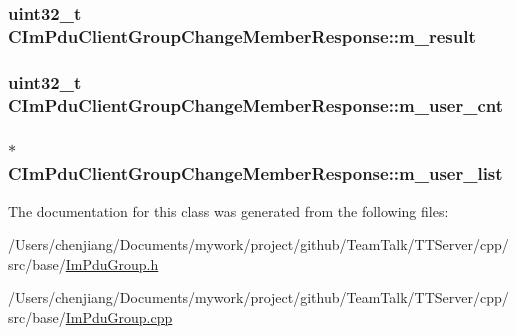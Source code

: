\subsubsection[{m\+\_\+result}]{\setlength{\rightskip}{0pt plus 5cm}uint32\+\_\+t C\+Im\+Pdu\+Client\+Group\+Change\+Member\+Response\+::m\+\_\+result\hspace{0.3cm}{\ttfamily [private]}}\label{class_c_im_pdu_client_group_change_member_response_aa5bb03802146fb0f2485032a85cb4122}
\hypertarget{class_c_im_pdu_client_group_change_member_response_a348f58a38f785cf7d7a24f34fbba78e6}{}
\subsubsection[{m\+\_\+user\+\_\+cnt}]{\setlength{\rightskip}{0pt plus 5cm}uint32\+\_\+t C\+Im\+Pdu\+Client\+Group\+Change\+Member\+Response\+::m\+\_\+user\+\_\+cnt\hspace{0.3cm}{\ttfamily [private]}}\label{class_c_im_pdu_client_group_change_member_response_a348f58a38f785cf7d7a24f34fbba78e6}
\hypertarget{class_c_im_pdu_client_group_change_member_response_ad848ce1ef9fceb547fd43fff7181af67}{}
\subsubsection[{m\+\_\+user\+\_\+list}]{$\ast$ C\+Im\+Pdu\+Client\+Group\+Change\+Member\+Response\+::m\+\_\+user\+\_\+list\hspace{0.3cm}{\ttfamily [private]}}\label{class_c_im_pdu_client_group_change_member_response_ad848ce1ef9fceb547fd43fff7181af67}


The documentation for this class was generated from the following files\+:\begin{DoxyCompactItemize}
\item 
/\+Users/chenjiang/\+Documents/mywork/project/github/\+Team\+Talk/\+T\+T\+Server/cpp/src/base/\hyperlink{_im_pdu_group_8h}{Im\+Pdu\+Group.\+h}\item 
/\+Users/chenjiang/\+Documents/mywork/project/github/\+Team\+Talk/\+T\+T\+Server/cpp/src/base/\hyperlink{_im_pdu_group_8cpp}{Im\+Pdu\+Group.\+cpp}\end{DoxyCompactItemize}
